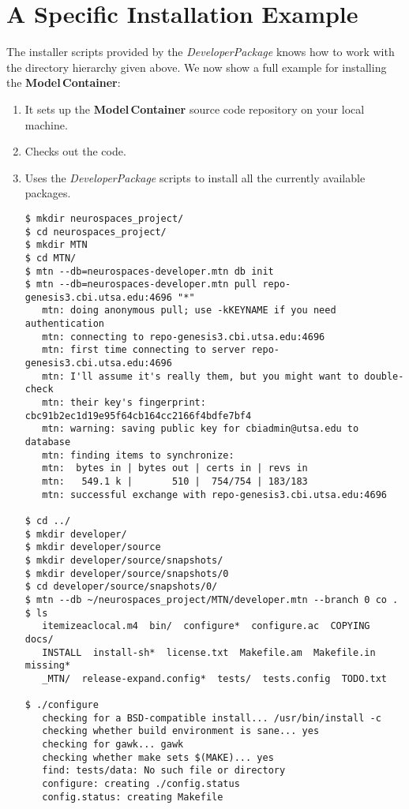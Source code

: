\documentclass[12pt]{article}
\begin{document}
\section*{A Specific Installation Example}

The installer scripts provided by the {\it DeveloperPackage} knows how to work with the directory hierarchy given above. We now show a full example for installing the {\bf Model\,Container}:

\begin{enumerate}
\item It sets up the {\bf Model\,Container} source code repository on your local machine.
\item Checks out the code.
\item Uses the {\it DeveloperPackage} scripts to install all the currently available packages.
\begin{verbatim}
$ mkdir neurospaces_project/
$ cd neurospaces_project/
$ mkdir MTN
$ cd MTN/
$ mtn --db=neurospaces-developer.mtn db init
$ mtn --db=neurospaces-developer.mtn pull repo-genesis3.cbi.utsa.edu:4696 "*"
   mtn: doing anonymous pull; use -kKEYNAME if you need authentication
   mtn: connecting to repo-genesis3.cbi.utsa.edu:4696
   mtn: first time connecting to server repo-genesis3.cbi.utsa.edu:4696
   mtn: I'll assume it's really them, but you might want to double-check
   mtn: their key's fingerprint: cbc91b2ec1d19e95f64cb164cc2166f4bdfe7bf4
   mtn: warning: saving public key for cbiadmin@utsa.edu to database
   mtn: finding items to synchronize:
   mtn:  bytes in | bytes out | certs in | revs in
   mtn:   549.1 k |       510 |  754/754 | 183/183
   mtn: successful exchange with repo-genesis3.cbi.utsa.edu:4696

$ cd ../
$ mkdir developer/
$ mkdir developer/source
$ mkdir developer/source/snapshots/
$ mkdir developer/source/snapshots/0
$ cd developer/source/snapshots/0/
$ mtn --db ~/neurospaces_project/MTN/developer.mtn --branch 0 co .
$ ls
   itemizeaclocal.m4  bin/  configure*  configure.ac  COPYING  docs/ 
   INSTALL  install-sh*  license.txt  Makefile.am  Makefile.in  missing* 
   _MTN/  release-expand.config*  tests/  tests.config  TODO.txt

$ ./configure 
   checking for a BSD-compatible install... /usr/bin/install -c
   checking whether build environment is sane... yes
   checking for gawk... gawk
   checking whether make sets $(MAKE)... yes
   find: tests/data: No such file or directory
   configure: creating ./config.status
   config.status: creating Makefile


\end{verbatim}
\end{enumerate}
\end{document}
